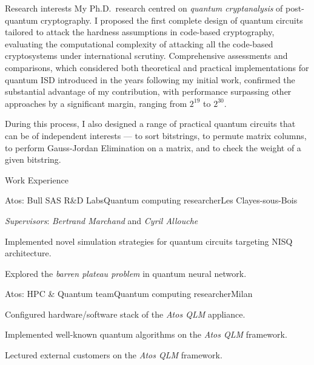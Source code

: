 \documentclass[
	a4paper, %
	10pt, %
]{tresume} %
\begin{document}
\begin{tSection}{Research interests}
  My Ph.D.\ research centred on \emph{quantum cryptanalysis} of post-quantum
  cryptography. I proposed the first complete design of quantum circuits
  tailored to attack the hardness assumptions in code-based cryptography,
  evaluating the computational complexity of attacking all the code-based
  cryptosystems under international scrutiny.
  Comprehensive assessments and comparisons, which considered both theoretical
  and practical implementations for quantum ISD introduced in the years
  following my initial work, confirmed the substantial advantage of my
  contribution, with performance surpassing other approaches by a significant
  margin, ranging from $2^{19}$ to $2^{30}$.

  During this process, I also designed a range of practical quantum circuits
  that can be of independent interests --- to sort bitstrings, to permute matrix
  columns, to perform Gauss-Jordan Elimination on a matrix, and to check the
  weight of a given bitstring.

\end{tSection}
\clearpage
\begin{tSection}{Work Experience}
  \begin{tSubsection}{Atos: Bull SAS R\&D Labs}{\origdate{}}{Quantum computing researcher}{Les Clayes-sous-Bois}
  \item \emph{Supervisors}: \emph{Bertrand Marchand} and \emph{Cyril Allouche}
  \item Implemented novel simulation strategies for quantum circuits targeting
    NISQ architecture.
  \item Explored the \emph{barren plateau problem} in quantum neural network.
  \end{tSubsection}

  \begin{tSubsection}{Atos: HPC \& Quantum team}{\origdate{}}{Quantum computing researcher}{Milan}
  \item Configured hardware/software stack of the \textit{Atos QLM} appliance.
  \item Implemented well-known quantum algorithms on the \textit{Atos QLM} framework.
  \item Lectured external customers on the \textit{Atos QLM} framework.
\end{tSubsection}
\end{tSection}
\end{document}
